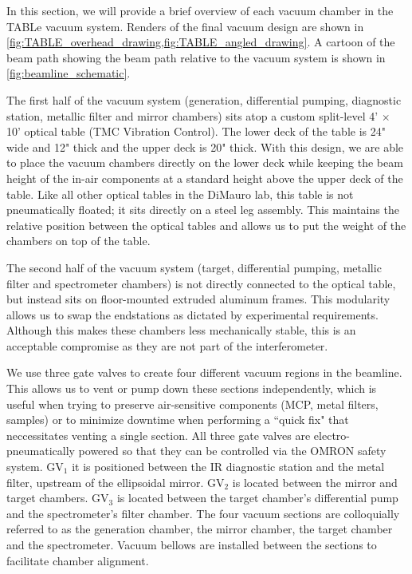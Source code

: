In this section, we will provide a brief overview of each vacuum chamber in the TABLe vacuum system. Renders of the final vacuum design are shown in \cref{fig:TABLE_overhead_drawing,fig:TABLE_angled_drawing}. A cartoon of the beam path showing the beam path relative to the vacuum system is shown in \cref{fig:beamline_schematic}.

The first half of the vacuum system (generation, differential pumping, diagnostic station,  metallic filter and mirror chambers) sits atop a custom split-level 4' $\times$ 10' optical table (TMC Vibration Control). The lower deck of the table is 24" wide and 12" thick and the upper deck is 20" thick. With this design, we are able to place the vacuum chambers directly on the lower deck while keeping the beam height of the in-air components at a standard height above the upper deck of the table. Like all other optical tables in the DiMauro lab, this table is not pneumatically floated; it sits directly on a steel leg assembly. This maintains the relative position between the optical tables and allows us to put the weight of the chambers on top of the table.

The second half of the vacuum system (target, differential pumping,  metallic filter and spectrometer chambers) is not directly connected to the optical table, but instead sits on floor-mounted extruded aluminum frames. This modularity allows us to swap the endstations as dictated by experimental requirements. Although this makes these chambers less mechanically stable, this is an acceptable compromise as they are not part of the interferometer.

We use three gate valves to create four different vacuum regions in the beamline. This allows us to vent or pump down these sections independently, which is useful when trying to preserve air-sensitive components (MCP, metal filters, samples) or to minimize downtime when performing a ``quick fix" that neccessitates venting a single section. All three gate valves are electro-pneumatically powered so that they can be controlled via the OMRON safety system. GV$_1$ it is positioned between the IR diagnostic station and the metal filter, upstream of the ellipsoidal mirror. GV$_2$ is located between the mirror and target chambers. GV$_3$ is located between the target chamber's differential pump and the spectrometer's filter chamber. The four vacuum sections are colloquially referred to as the generation chamber, the mirror chamber, the target chamber and the spectrometer. Vacuum bellows are installed between the sections to facilitate chamber alignment.

